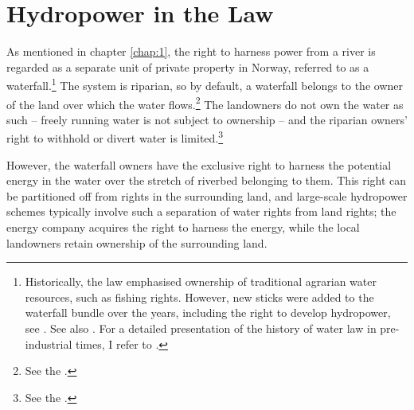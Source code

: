 \section{Hydropower in the Law}\label{sec:4:3}

As mentioned in chapter \ref{chap:1}, the right to harness power from a river is regarded as a separate unit of private property in Norway, referred to as a waterfall.\footnote{Historically, the law emphasised ownership of traditional agrarian water resources, such as fishing rights. However, new sticks were added to the waterfall bundle over the years, including the right to develop hydropower, see \cite[14-32]{vislie44}. See also \cite[108]{nordtveit15}. For a detailed presentation of the history of water law in pre-industrial times, I refer to \cite{motzfeld08}.} The system is riparian, so by default, a waterfall belongs to the owner of the land over which the water flows.\footnote{See the \dni\cite[13]{wra00}.} The landowners do not own the water as such -- freely running water is not subject to ownership -- and the riparian owners' right to withhold or divert water is limited.\footnote{See the \dni\cite[8|15]{wra00}.} 


However, the waterfall owners have the exclusive right to harness the potential energy in the water over the stretch of riverbed belonging to them. This right can be partitioned off from rights in the surrounding land, and large-scale hydropower schemes typically involve such a separation of water rights from land rights; the energy company acquires the right to harness the energy, while the local landowners retain ownership of the surrounding land.

